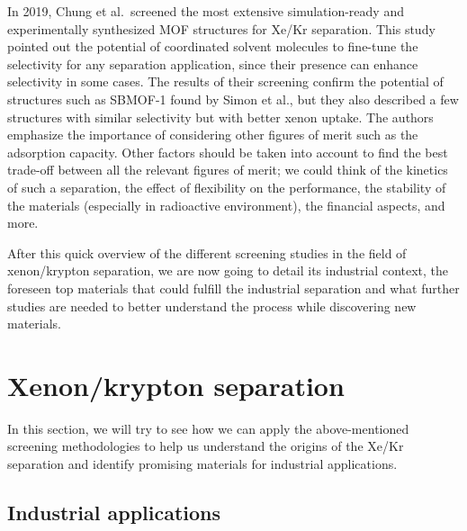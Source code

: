 \documentclass[main.tex]{subfiles}
\begin{document}
In 2019, Chung et al.\ screened the most extensive simulation-ready and experimentally synthesized MOF structures for Xe/Kr separation.\cite{Chung_2019} This study pointed out the potential of coordinated solvent molecules to fine-tune the selectivity for any separation application, since their presence can enhance selectivity in some cases. The results of their screening confirm the potential of structures such as SBMOF-1 found by Simon et al., but they also described a few structures with similar selectivity but with better xenon uptake. The authors emphasize the importance of considering other figures of merit such as the adsorption capacity. Other factors should be taken into account to find the best trade-off between all the relevant figures of merit; we could think of the kinetics of such a separation, the effect of flexibility on the performance, the stability of the materials (especially in radioactive environment), the financial aspects, and more.

After this quick overview of the different screening studies in the field of xenon/krypton separation, we are now going to detail its industrial context, the foreseen top materials that could fulfill the industrial separation and what further studies are needed to better understand the process while discovering new materials.


\section{Xenon/krypton separation}

In this section, we will try to see how we can apply the above-mentioned screening methodologies to help us understand the origins of the Xe/Kr separation and identify promising materials for industrial applications. 

\subsection{Industrial applications}
\end{document}
